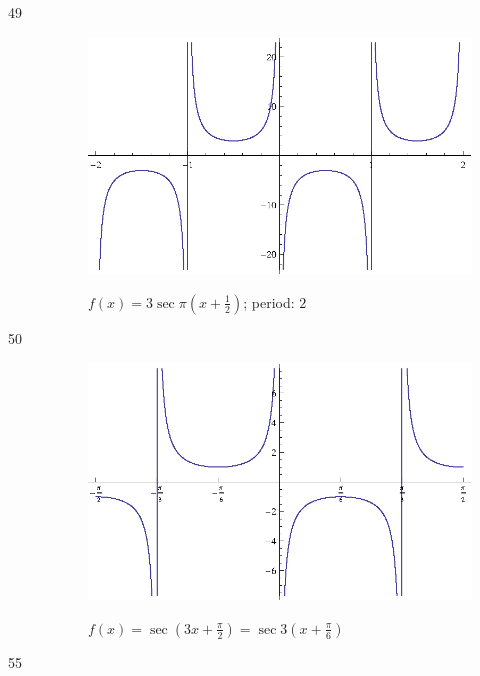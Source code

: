 \documentclass{exam}
\begin{document}
\begin{description}
      \item[49]
        \begin{figure}[H]
          \centering
          \includegraphics[scale=0.9]{exercise49.eps}

          $f(x) = 3 \sec \pi \left( x + \frac{1}{2} \right)$; period: $2$
        \end{figure}

      \item[50]  

        \begin{figure}[H]
          \centering
          \includegraphics[scale=0.9]{exercise50.eps}

          $f(x) = \sec \left( 3x + \frac{\pi}{2} \right) = \sec 3 \left( x + \frac{\pi}{6} \right)$
        \end{figure}

      \item[55]
\end{description}
\end{document}
